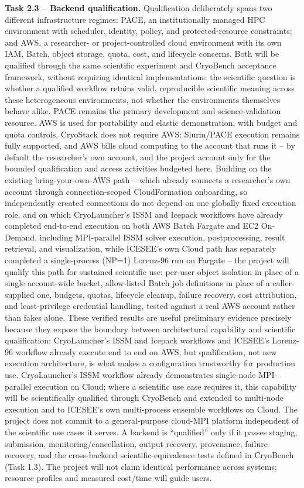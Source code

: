 \textbf{Task 2.3 -- Backend qualification.} Qualification deliberately spans
two different infrastructure regimes: PACE, an institutionally managed HPC
environment with scheduler, identity, policy, and protected-resource
constraints; and AWS, a researcher- or project-controlled cloud environment
with its own IAM, Batch, object storage, quota, cost, and lifecycle concerns.
Both will be qualified through the same scientific experiment and CryoBench
acceptance framework, without requiring identical implementations: the
scientific question is whether a qualified workflow retains valid,
reproducible scientific meaning across these heterogeneous environments, not
whether the environments themselves behave alike. PACE remains the primary
development and science-validation resource. AWS is used for portability and
elastic demonstration, with budget and quota controls. CryoStack does not
require AWS: Slurm/PACE execution remains fully supported, and AWS bills cloud
computing to the account that runs it -- by default the researcher's own
account, and the project account only for the bounded qualification and access
activities budgeted here. Building on the
existing bring-your-own-AWS path -- which already connects a researcher's own
account through connection-scoped CloudFormation onboarding, so independently
created connections do not depend on one globally fixed execution role, and
on which CryoLauncher's ISSM and Icepack workflows have already completed
end-to-end execution on both AWS Batch Fargate and EC2 On-Demand, including
MPI-parallel ISSM solver execution, postprocessing, result retrieval, and
visualization, while ICESEE's own Cloud path has separately completed a
single-process (NP=1) Lorenz-96 run on Fargate -- the project will qualify
this path for sustained scientific use: per-user object isolation in place of
a single account-wide bucket, allow-listed Batch job definitions in place of
a caller-supplied one, budgets, quotas, lifecycle cleanup, failure recovery,
cost attribution, and least-privilege credential handling, tested against a
real AWS account rather than fakes alone. These verified results are useful
preliminary evidence precisely because they expose the boundary between
architectural capability and scientific qualification: CryoLauncher's ISSM
and Icepack workflows and ICESEE's Lorenz-96 workflow already execute end to
end on AWS, but qualification, not new execution architecture, is what makes
a configuration trustworthy for production use. CryoLauncher's ISSM workflow
already demonstrates single-node MPI-parallel execution on Cloud; where a
scientific use case requires it, this capability will be scientifically
qualified through CryoBench and extended to multi-node execution and to
ICESEE's own multi-process ensemble workflows on Cloud. The project does not
commit to a general-purpose cloud-MPI platform independent of the scientific
use cases it serves. A backend is
``qualified'' only if it passes staging, submission,
monitoring/cancellation, output recovery, provenance, failure-recovery, and
the cross-backend scientific-equivalence tests defined in CryoBench
(Task 1.3). The project will not claim identical performance across
systems; resource profiles and measured cost/time will guide users.

